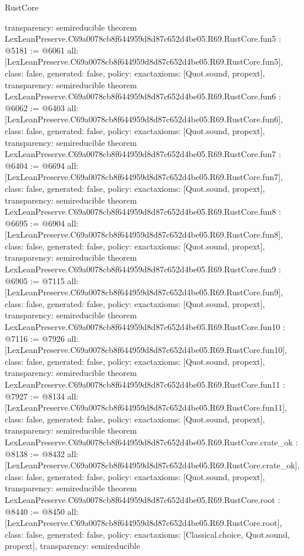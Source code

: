 \begin{lexlean}{RustCore}
\begin{coremodule}
{  transparency: semireducible
}
theorem LexLeanPreserve.C69a0078cb8f644959d8d87c652d4be05.R69.RustCore.fun5 : @5181 := @6061 {
  all: [LexLeanPreserve.C69a0078cb8f644959d8d87c652d4be05.R69.RustCore.fun5],
  class: false,
  generated: false,
  policy: exact{axioms: [Quot.sound, propext]},
  transparency: semireducible
}
theorem LexLeanPreserve.C69a0078cb8f644959d8d87c652d4be05.R69.RustCore.fun6 : @6062 := @6403 {
  all: [LexLeanPreserve.C69a0078cb8f644959d8d87c652d4be05.R69.RustCore.fun6],
  class: false,
  generated: false,
  policy: exact{axioms: [Quot.sound, propext]},
  transparency: semireducible
}
theorem LexLeanPreserve.C69a0078cb8f644959d8d87c652d4be05.R69.RustCore.fun7 : @6404 := @6694 {
  all: [LexLeanPreserve.C69a0078cb8f644959d8d87c652d4be05.R69.RustCore.fun7],
  class: false,
  generated: false,
  policy: exact{axioms: [Quot.sound, propext]},
  transparency: semireducible
}
theorem LexLeanPreserve.C69a0078cb8f644959d8d87c652d4be05.R69.RustCore.fun8 : @6695 := @6904 {
  all: [LexLeanPreserve.C69a0078cb8f644959d8d87c652d4be05.R69.RustCore.fun8],
  class: false,
  generated: false,
  policy: exact{axioms: [Quot.sound, propext]},
  transparency: semireducible
}
theorem LexLeanPreserve.C69a0078cb8f644959d8d87c652d4be05.R69.RustCore.fun9 : @6905 := @7115 {
  all: [LexLeanPreserve.C69a0078cb8f644959d8d87c652d4be05.R69.RustCore.fun9],
  class: false,
  generated: false,
  policy: exact{axioms: [Quot.sound, propext]},
  transparency: semireducible
}
theorem LexLeanPreserve.C69a0078cb8f644959d8d87c652d4be05.R69.RustCore.fun10 : @7116 := @7926 {
  all: [LexLeanPreserve.C69a0078cb8f644959d8d87c652d4be05.R69.RustCore.fun10],
  class: false,
  generated: false,
  policy: exact{axioms: [Quot.sound, propext]},
  transparency: semireducible
}
theorem LexLeanPreserve.C69a0078cb8f644959d8d87c652d4be05.R69.RustCore.fun11 : @7927 := @8134 {
  all: [LexLeanPreserve.C69a0078cb8f644959d8d87c652d4be05.R69.RustCore.fun11],
  class: false,
  generated: false,
  policy: exact{axioms: [Quot.sound, propext]},
  transparency: semireducible
}
theorem LexLeanPreserve.C69a0078cb8f644959d8d87c652d4be05.R69.RustCore.crate_ok : @8138 := @8432 {
  all: [LexLeanPreserve.C69a0078cb8f644959d8d87c652d4be05.R69.RustCore.crate_ok],
  class: false,
  generated: false,
  policy: exact{axioms: [Quot.sound, propext]},
  transparency: semireducible
}
theorem LexLeanPreserve.C69a0078cb8f644959d8d87c652d4be05.R69.RustCore.root : @8440 := @8450 {
  all: [LexLeanPreserve.C69a0078cb8f644959d8d87c652d4be05.R69.RustCore.root],
  class: false,
  generated: false,
  policy: exact{axioms: [Classical.choice, Quot.sound, propext]},
  transparency: semireducible
}


\end{coremodule}
\end{lexlean}
